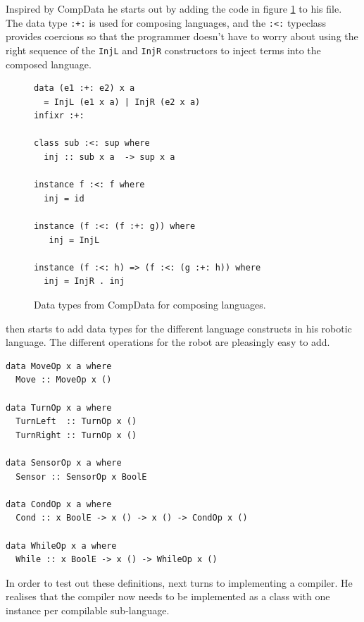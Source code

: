 Inspired by CompData he starts out by adding the code in figure
\ref{fig:compdata} to his file. The data type \texttt{:+:} is used for
composing languages, and the \texttt{:<:} typeclass provides coercions
so that the programmer doesn't have to worry about using the right
sequence of the \texttt{InjL} and \texttt{InjR} constructors to inject
terms into the composed language.

\begin{figure}
\begin{small}
\begin{verbatim}
data (e1 :+: e2) x a 
  = InjL (e1 x a) | InjR (e2 x a)
infixr :+:

class sub :<: sup where
  inj :: sub x a  -> sup x a

instance f :<: f where
  inj = id

instance (f :<: (f :+: g)) where
   inj = InjL  

instance (f :<: h) => (f :<: (g :+: h)) where
  inj = InjR . inj 
\end{verbatim}
\end{small}
\caption{Data types from CompData for composing languages.}
\label{fig:compdata}
\end{figure}

\studname{} then starts to add data types for the different language
constructs in his robotic language. The different operations for the
robot are pleasingly easy to add.
\begin{small}
\begin{verbatim}
data MoveOp x a where 
  Move :: MoveOp x () 

data TurnOp x a where 
  TurnLeft  :: TurnOp x () 
  TurnRight :: TurnOp x () 

data SensorOp x a where 
  Sensor :: SensorOp x BoolE

data CondOp x a where 
  Cond :: x BoolE -> x () -> x () -> CondOp x () 

data WhileOp x a where 
  While :: x BoolE -> x () -> WhileOp x () 
\end{verbatim}
\end{small}

In order to test out these definitions, \studname{} next turns to
implementing a compiler. He realises that the compiler now needs to be
implemented as a class with one instance per compilable sub-language.

